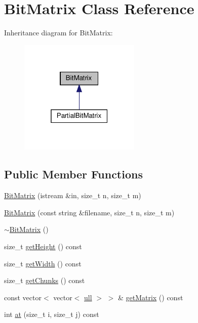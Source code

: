 \hypertarget{classBitMatrix}{}\section{Bit\+Matrix Class Reference}
\label{classBitMatrix}


Inheritance diagram for Bit\+Matrix\+:
\nopagebreak
\begin{figure}[H]
\begin{center}
\leavevmode
\includegraphics[width=163pt]{classBitMatrix__inherit__graph}
\end{center}
\end{figure}
\subsection*{Public Member Functions}
\begin{DoxyCompactItemize}
\item 
\hyperlink{classBitMatrix_aea3afaf70111c302f23971bbb84dee10}{Bit\+Matrix} (istream \&in, size\+\_\+t n, size\+\_\+t m)
\item 
\hyperlink{classBitMatrix_a47e8b65693dc2e86541d0098232654a7}{Bit\+Matrix} (const string \&filename, size\+\_\+t n, size\+\_\+t m)
\item 
\hyperlink{classBitMatrix_aa264bc0bfe4a54ca8e0cafcd17aaddd1}{$\sim$\+Bit\+Matrix} ()
\item 
size\+\_\+t \hyperlink{classBitMatrix_a45b01a2a1e0cd1227cbe06d0c47c35d1}{get\+Height} () const
\item 
size\+\_\+t \hyperlink{classBitMatrix_ae4bf5529a6676a836a0ff965285e9907}{get\+Width} () const
\item 
size\+\_\+t \hyperlink{classBitMatrix_ac4ddfe5f94dba2904d9d6319bbdd8012}{get\+Chunks} () const
\item 
const vector$<$ vector$<$ \hyperlink{main_8cpp_a49d1cb44c18ad3e6cc52845f905e6181}{ull} $>$ $>$ \& \hyperlink{classBitMatrix_a167706d1d6576f29382fc55b5c99884d}{get\+Matrix} () const
\item 
int \hyperlink{classBitMatrix_a4ec563a3bf6d62141d719ebeed5348e8}{at} (size\+\_\+t i, size\+\_\+t j) const
\end{DoxyCompactItemize}
